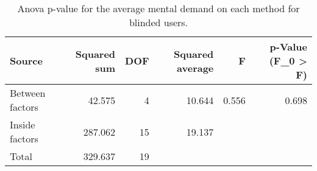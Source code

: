 
\begin{table}[!htb]
\centering
\caption{Anova p-value for the average mental demand on each method for blinded users.}
\label{tab:anova_mental_demand_avg}
\begin{tabular}{lrrrrr}
\toprule
         Source &  Squared sum &  DOF & Squared average &     F & p-Value (F\_0 > F) \\
\midrule
Between factors &       42.575 &    4 &          10.644 & 0.556 &             0.698 \\
 Inside factors &      287.062 &   15 &          19.137 &       &                   \\
          Total &      329.637 &   19 &                 &       &                   \\
\bottomrule
\end{tabular}
\end{table}


